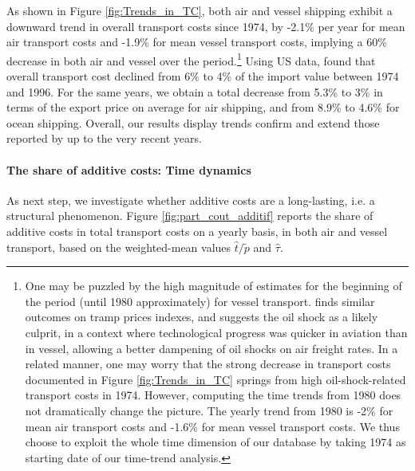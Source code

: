 \documentclass[a4paper,11pt]{article}
\begin{document}
As shown in Figure \ref{fig:Trends_in_TC}, both air and vessel shipping exhibit a downward trend in overall transport costs since 1974, by -2.1\% per year for mean air transport costs and -1.9\% for mean vessel transport costs, implying a 60\% decrease in both air and vessel over the period.\footnote{One may be puzzled by the high magnitude of estimates for the beginning of the period (until 1980 approximately) for vessel transport.
\cite{hummels2007} finds similar outcomes on tramp prices indexes, and suggests the oil shock as a likely culprit, in a context where technological progress was quicker in aviation than in vessel, allowing a better dampening of oil shocks on air freight rates.
In a related manner, one may worry that the strong decrease in transport costs documented in Figure \ref{fig:Trends_in_TC} springs from high oil-shock-related transport costs in 1974. However, computing the time trends from 1980 does not dramatically change the picture.
The yearly trend from 1980 is -2\% for mean air transport costs and -1.6\% for mean vessel transport costs.
We thus choose to exploit the whole time dimension of our database by taking 1974 as starting date of our time-trend analysis.} Using US data, \cite{Hummels_1999} found that overall transport cost declined from 6\% to 4\% of the import value between 1974 and 1996.
For the same years, we obtain a total decrease from 5.3\% to 3\% in terms of the export price on average for air shipping, and from 8.9\% to 4.6\% for ocean shipping. Overall, our results display trends confirm and extend those reported by \cite{Hummels_1999} up to the very recent years.\smallskip

\paragraph{The share of additive costs: Time dynamics} As next step, we investigate whether additive costs are a long-lasting, i.e. a structural phenomenon. Figure \ref{fig:part_cout_additif} reports the share of additive costs in total transport costs on a yearly basis, in both air and vessel transport, based on the weighted-mean values $\widehat{t}/\widetilde{p}$ and $\widehat{\tau}$.
\end{document}
